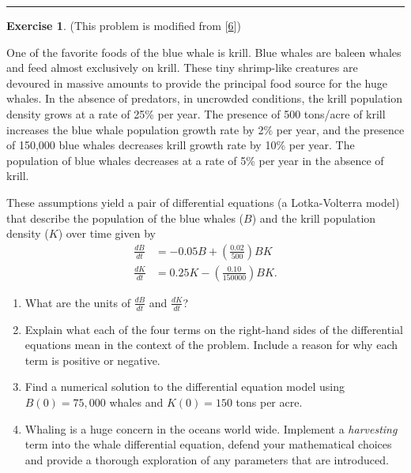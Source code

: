 \documentclass[
]{book}
\theoremstyle{definition}
\theoremstyle{definition}
\theoremstyle{definition}
\newtheorem{exercise}{Exercise}[chapter]
\theoremstyle{remark}
\begin{document}
\begin{center}\rule{0.5\linewidth}{0.5pt}\end{center}

\begin{exercise}
\protect\hypertarget{exr:unnamed-chunk-505}{}{\label{exr:unnamed-chunk-505} }(This problem is modified from {[}\protect\hyperlink{ref-meerschaert}{6}{]})

One of the favorite foods of the blue whale is krill. Blue whales are
baleen whales and feed almost exclusively on krill. These tiny
shrimp-like creatures are devoured in massive amounts to provide the
principal food source for the huge whales. In the absence of predators,
in uncrowded conditions, the krill population density grows at a rate of
25\% per year. The presence of 500 tons/acre of krill increases the blue
whale population growth rate by 2\% per year, and the presence of 150,000
blue whales decreases krill growth rate by 10\% per year. The population
of blue whales decreases at a rate of 5\% per year in the absence of
krill.

These assumptions yield a pair of differential equations (a
Lotka-Volterra model) that describe the population of the blue whales
(\(B\)) and the krill population density (\(K\)) over time given by
\[\begin{aligned}
        \frac{dB}{dt} &= -0.05B + \left( \frac{0.02}{500} \right) BK \\
        \frac{dK}{dt} &= 0.25K - \left( \frac{0.10}{150000} \right) BK.
    \end{aligned}\]

\begin{enumerate}
\def\labelenumi{\alph{enumi}.}
\item
  What are the units of \(\frac{dB}{dt}\) and \(\frac{dK}{dt}\)?
\item
  Explain what each of the four terms on the right-hand sides of the
  differential equations mean in the context of the problem. Include a
  reason for why each term is positive or negative.
\item
  Find a numerical solution to the differential equation model using
  \(B(0) = 75,000\) whales and \(K(0) = 150\) tons per acre.
\item
  Whaling is a huge concern in the oceans world wide. Implement a
  \emph{harvesting} term into the whale differential equation, defend your
  mathematical choices and provide a thorough exploration of any
  parameters that are introduced.
\end{enumerate}
\end{exercise}
\end{document}
